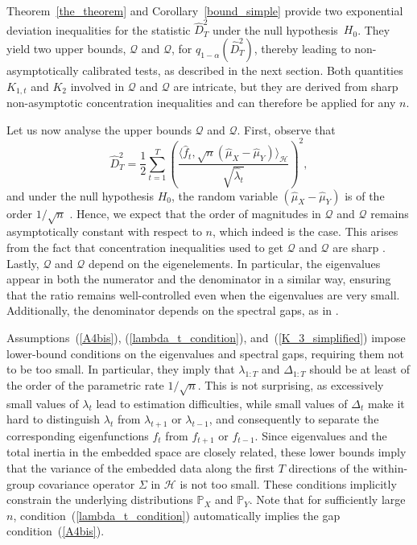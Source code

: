 \documentclass[twoside,11pt]{article}
\newcommand{\Hk}{\mathcal{H}}
\newcommand{\nb}{n}
\newcommand{\PP}{\mathbb{P}}%
\newcommand{\trueq}[1]{q_{1-\alpha}(#1) }
\newcommand{\qmaj}{\mathcal{Q}}
\newcommand{\qmajbis}{\mathscr{Q}}
\begin{document}
Theorem~\ref{the_theorem} and Corollary~\ref{bound_simple} provide two exponential deviation inequalities for the statistic $\widehat{D}^2_T$ under the null hypothesis~$H_0$. They yield two upper bounds, $\qmaj$ and $\qmajbis$,  for $\trueq{\widehat{D}^2_T}$, thereby leading to non-asymptotically calibrated tests, as described in the next section. Both quantities $K_{1,t}$ and $K_2$ involved in  $\qmaj$ and $\qmajbis$ are intricate, but they are derived from sharp non-asymptotic concentration inequalities and can therefore be applied for any $\nb$. 

Let us now analyse the upper bounds $\qmaj$ and $\qmajbis$. First, observe that 
$$  
\widehat{D}^2_T = \frac{1}{2} \underset{t=1}{\overset{T}{\sum}} \left(\frac{\langle \widehat{f}_t, \sqrt{n} \left(\widehat{\mu}_X - \widehat{\mu}_Y \right) \rangle_{\Hk}}{\sqrt{\widehat{\lambda}_t}} \right)^2,
$$
and under the null hypothesis $H_0$, the random variable $\left(\widehat{\mu}_X - \widehat{\mu}_Y\right)$ is of the order $1/\sqrt{n}$ \citep{eric2007testing}. 
Hence, we expect that the order of magnitudes in $\qmaj$ and $\qmajbis$ remains asymptotically constant with respect to $n$, which indeed is the case. This arises from the fact that concentration inequalities used to get $\qmaj$ and $\qmajbis$ are sharp \citep{zwald2005convergence,reiss2020nonasymptotic,bertail2008exponential}. 
Lastly, $\qmaj$ and $\qmajbis$ depend on the eigenelements. In particular, the eigenvalues appear in both the numerator and the denominator in a similar way,  ensuring that the ratio remains well-controlled even when the eigenvalues are very small. Additionally, the denominator depends on the spectral gaps, as in \cite{reiss2020nonasymptotic}.


Assumptions~(\ref{A4bis}), (\ref{lambda_t_condition}), and~(\ref{K_3_simplified}) impose lower-bound conditions on the eigenvalues and spectral gaps, requiring them not to be too small. In particular, they imply that $\lambda_{1:T}$ and $\Delta_{1:T}$ should be at least of the order of the parametric rate $1/\sqrt{n}$. This is not surprising, as excessively small values of $\lambda_t$ lead to estimation difficulties, while small values of $\Delta_t$ make it hard to distinguish $\lambda_t$ from $\lambda_{t+1}$ or $\lambda_{t-1}$, and consequently to separate the corresponding eigenfunctions $f_t$ from $f_{t+1}$ or $f_{t-1}$. Since eigenvalues and the total inertia in the embedded space are closely related, these lower bounds imply that the variance of the embedded data along the first $T$ directions of the within-group covariance operator $\Sigma$ in $\Hk$ is not too small.  These conditions implicitly constrain the underlying distributions $\PP_X$ and $\PP_Y$.  Note that for sufficiently large $n$, condition~(\ref{lambda_t_condition}) automatically implies the gap condition~(\ref{A4bis}).  
\end{document}
